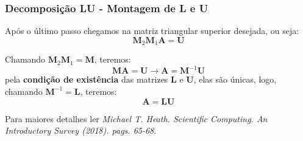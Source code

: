 \documentclass{beamer}
\theoremstyle{mystyle}
\begin{document}
\begin{frame}
	\frametitle{Decomposição LU - Montagem de L e U}
	Após o último passo chegamos na matriz triangular superior desejada, ou seja:
	\begin{equation*}
		\mathbf{M}_{2}\mathbf{M}_{1}\mathbf{A} = \textbf{U}
	\end{equation*}

	Chamando $ \mathbf{M}_{2}\mathbf{M}_{1} = \mathbf{M} $, teremos:
	\begin{equation*}
		\mathbf{M}\mathbf{A} = \textbf{U} \rightarrow \mathbf{A} =  \mathbf{M}^{-1}\textbf{U} 
	\end{equation*}
	pela \textbf{condição de existência} das matrizes \textbf{L} e \textbf{U}, elas são únicas, logo, chamando $ \mathbf{M}^{-1} = \mathbf{L} $, teremos:
	\begin{equation*}
		\mathbf{A} =  \mathbf{L}\textbf{U} 
	\end{equation*}

	Para maiores detalhes ler \emph{Michael T. Heath. Scientific Computing. An Introductory Survey (2018). pags. 65-68}.
\end{frame}
\end{document}
